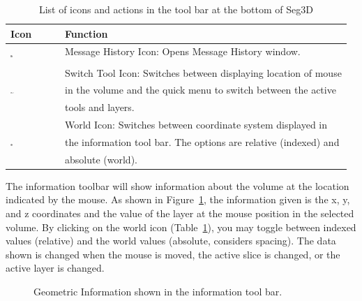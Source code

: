 \documentclass[fleqn,11pt,openany]{book}
\begin{document}
\begin{table}[h!]
\label{tab:toolbaricons}
\caption{List of icons and actions in the tool bar at the bottom of Seg3D}
\begin{tabular}{|l|l|}
\hline
{\bf Icon} & {\bf Function}\\
\hline
\multirow{2}{*}{ \includegraphics[width=0.05\textwidth]{Seg3DBasicFunctionality_figures/TextOff.png} }
& Message History Icon: Opens Message History window.\\
& \\
\hline
\multirow{3}{*}{ \includegraphics[width=0.08\textwidth]{Seg3DBasicFunctionality_figures/SwitchTool.png} }
& Switch Tool Icon:  Switches between displaying location of mouse\\
& in the volume and the quick menu to switch between the active \\
& tools and layers.\\
\hline
\multirow{3}{*}{ \includegraphics[width=0.05\textwidth]{Seg3DBasicFunctionality_figures/WorldOff.png} }
& World Icon:  Switches between coordinate system displayed in \\
& the information tool bar.  The options are relative (indexed) and \\
& absolute (world).\\
\hline
\end{tabular}
\end{table}

The information toolbar will show information about the volume at the location indicated by the mouse.
As shown in Figure~\ref{fig:geometricinfo}, the information given is the x, y, and z coordinates and the value of the layer at the mouse position in the selected volume.
By clicking on the world icon (Table~\ref{tab:toolbaricons}), you may toggle between indexed values (relative) and the world values (absolute, considers spacing).
The data shown is changed when the mouse is moved, the active slice is changed, or the active layer is changed.

\begin{figure}[h!]
\caption{Geometric Information shown in the information tool bar.}\label{fig:geometricinfo}
\end{figure}
\end{document}
